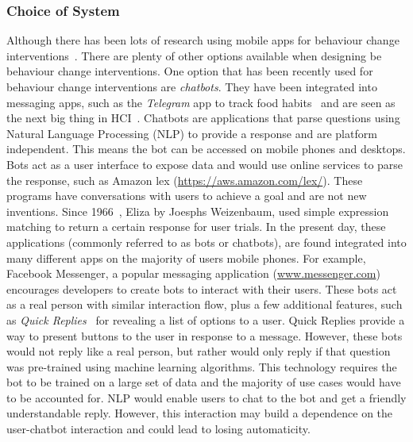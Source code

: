 \subsubsection*{Choice of System}
Although there has been lots of research using mobile apps for behaviour change interventions~\cite{survey_on_current_apps_of_steel}. There are plenty of other options available when designing be behaviour change interventions. One option that has been recently used for behaviour change interventions are \textit{chatbots}. They have been integrated into messaging apps, such as the \textit{Telegram} app to track food habits~\cite{telegram_bot_tracking_habits} and are seen as the next big thing in HCI~\cite{chatbots_and_new_world_of_hci}. Chatbots are applications that parse questions using Natural Language Processing (NLP) to provide a response and are platform independent. This means the bot can be accessed on mobile phones and desktops. Bots act as a user interface to expose data and would use online services to parse the response, such as Amazon lex (\url{https://aws.amazon.com/lex/}). These programs have conversations with users to achieve a goal and are not new inventions. Since 1966~\cite{article_eliza}, Eliza by Joesphs Weizenbaum, used simple expression matching to return a certain response for user trials. In the present day, these applications (commonly referred to as bots or chatbots), are found integrated into many different apps on the majority of users mobile phones. For example, Facebook Messenger, a popular messaging application (\url{www.messenger.com}) encourages developers to create bots to interact with their users. These bots act as a real person with similar interaction flow, plus a few additional features, such as \textit{Quick Replies}~\cite{doc_fb_quick_replies} for revealing a list of options to a user. Quick Replies provide a way to present buttons to the user in response to a message. However, these bots would not reply like a real person, but rather would only reply if that question was pre-trained using machine learning algorithms. This technology requires the bot to be trained on a large set of data and the majority of use cases would have to be accounted for. NLP would enable users to chat to the bot and get a friendly understandable reply. However, this interaction may build a dependence on the user-chatbot interaction and could lead to losing automaticity.



